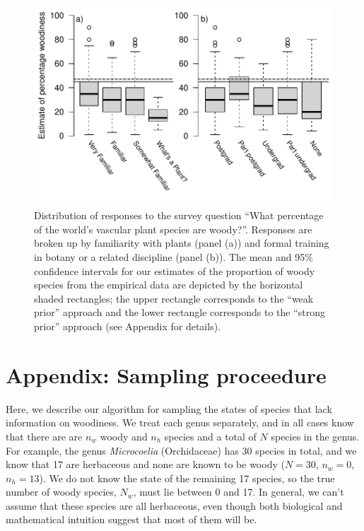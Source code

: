 \documentclass[12pt]{article}
\begin{document}
\begin{figure}[p]
  \centering
  \includegraphics{figs/survey-results}
  \caption{
    Distribution of responses to the survey question ``What percentage
    of the world's vascular plant species are woody?''. Responses are
    broken up by familiarity with plants (panel (a)) and formal
    training in botany or a related discipline (panel (b)). The mean
    and 95\% confidence intervals for our estimates of the proportion
    of woody species from the empirical data are depicted by the horizontal
    shaded rectangles; the upper rectangle corresponds to the ``weak
    prior'' approach and the lower rectangle corresponds to the ``strong
    prior'' approach (see Appendix for details).}
  \label{fig:survey}
\end{figure}

\clearpage
\renewcommand\thefigure{S.\arabic{figure}}
\appendix
\section{Appendix: Sampling proceedure}
\setcounter{figure}{0}    

Here, we describe our algorithm for sampling the states of species
that lack information on woodiness.  We treat each genus separately,
and in all cases know that there are are $n_w$ woody and $n_h$ species
and a total of $N$ species in the genus.
%
For example, the genus \textit{Microcoelia} (Orchidaceae) has 30
species in total, and we know that 17 are herbaceous and none are
known to be woody ($N = 30$, $n_w = 0$, $n_h = 13$).  We do not know
the state of the remaining 17 species, so the true number of woody
species, $N_w$, must lie between 0 and 17.  In general, we can't
assume that these species are all herbaceous, even though both
biological and mathematical intuition suggest that most of them will
be.
\end{document}
